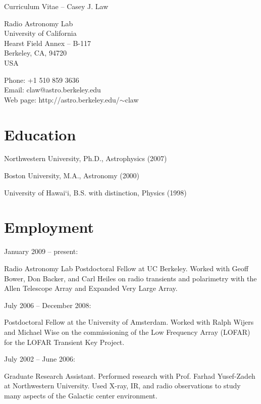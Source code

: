 \documentclass[12pt]{article}
\begin{document}
\begin{center}
\Large{Curriculum Vitae -- Casey J. Law}
\end{center}

\begin{flushright}
Radio Astronomy Lab \\
University of California \\
Hearst Field Annex -- B-117 \\
Berkeley, CA, 94720 \\
USA
\end{flushright}

\begin{flushright}
Phone:  +1 510 859 3636 \\
Email:  claw@astro.berkeley.edu \\
Web page: http://astro.berkeley.edu/$\sim$claw
\end{flushright}

\section{Education}
\indent 

Northwestern University, Ph.D., Astrophysics (2007)

Boston University, M.A., Astronomy (2000)

University of Hawai`i, B.S. with distinction, Physics (1998)

\section{Employment}
\indent

\begin{bf}January 2009 -- present: \end{bf} Radio Astronomy Lab Postdoctoral Fellow at UC Berkeley.  Worked with Geoff Bower, Don Backer, and Carl Heiles on radio transients and polarimetry with the Allen Telescope Array and Expanded Very Large Array.

\begin{bf}July 2006 -- December 2008: \end{bf}Postdoctoral Fellow at the University of Amsterdam.  Worked with Ralph Wijers and Michael Wise on the commissioning of the Low Frequency Array (LOFAR) for the LOFAR Transient Key Project.

\begin{bf}July 2002 -- June 2006:  \end{bf}Graduate Research Assistant.  Performed research with Prof. Farhad Yusef-Zadeh at Northwestern University.  Used X-ray, IR, and radio observations to study many aspects of the Galactic center environment.
\end{document}
